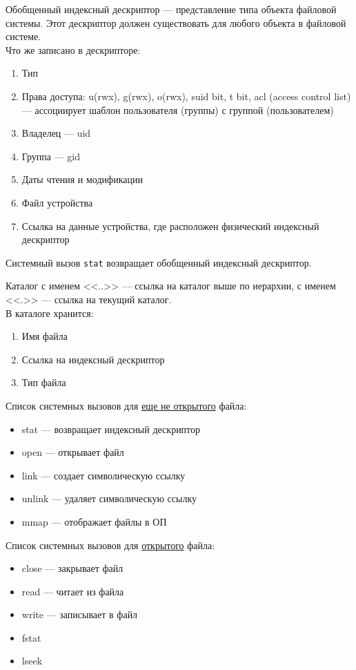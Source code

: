 Обобщенный индексный дескриптор --- представление типа объекта файловой системы. Этот дескриптор должен существовать для любого объекта в файловой системе.
\\

Что же записано в дескрипторе:
\begin{enumerate}
\item Тип
\item Права доступа: u(rwx), g(rwx), o(rwx), suid bit, t bit, acl (access control list) --- ассоциирует шаблон пользователя (группы) с группой (пользователем)
\item Владелец --- uid
\item Группа --- gid
\item Даты чтения и модификации
\item Файл устройства
\item Ссылка на данные устройства, где расположен физический индексный дескриптор
\end{enumerate}

Системный вызов \verb!stat! возвращает обобщенный  индексный дескриптор.

Каталог с именем <<..>> --- ссылка на каталог выше по иерархии, с именем <<.>> --- ссылка на текущий каталог.
\\

В каталоге хранится:
\begin{enumerate}
\item Имя файла
\item Ссылка на индексный дескриптор
\item Тип файла
\end{enumerate}

Список системных вызовов для \underline{еще не открытого} файла:
\begin{itemize}
\item stat --- возвращает индексный дескриптор
\item open --- открывает файл
\item link --- создает символическую ссылку
\item unlink --- удаляет символическую ссылку
\item mmap --- отображает файлы в ОП
\end{itemize}

Список системных вызовов для \underline{открытого} файла:
\begin{itemize}
\item close --- закрывает файл
\item read --- читает из файла
\item write --- записывает в файл
\item fstat
\item lseek
\end{itemize}

